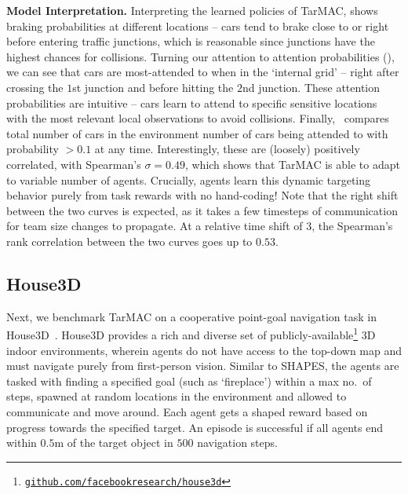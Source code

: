 \vspace{5pt}
\textbf{Model Interpretation.} Interpreting the learned policies of TarMAC,
 shows braking probabilities at different locations --
cars tend to brake close to or right before entering traffic junctions, which is reasonable
since junctions have the highest chances for collisions.
Turning our attention to attention probabilities (),
we can see that cars are most-attended to when in the `internal grid' -- right after
crossing the $1$st junction and before hitting the $2$nd junction. These attention
probabilities are intuitive -- cars learn to attend to specific sensitive locations
with the most relevant local observations to avoid collisions.
Finally,~
compares total number of cars in the environment
\vs number of cars
being attended to with probability $> 0.1$ at any time. Interestingly, these are (loosely)
positively correlated, with Spearman's $\sigma=0.49$, which shows that TarMAC
is able to adapt to variable number of agents. Crucially, agents learn this dynamic targeting behavior purely from task rewards with
no hand-coding! Note that the right shift between the two curves is
expected, as it takes a few timesteps of communication for team size changes to propagate.
At a relative time shift of $3$, the Spearman's rank correlation between the two curves goes up to $0.53$.

\vspace{-5pt}
\subsection{House3D}
\label{sec:h3d}

Next, we benchmark TarMAC on a cooperative point-goal
navigation task in House3D~\citep{house3d}. House3D provides a rich and diverse
set of publicly-available\footnote{\href{https://github.com/facebookresearch/house3d}{\texttt{github.com/facebookresearch/house3d}}}
$3$D indoor environments, wherein agents do not have access to the top-down map
and must navigate purely from first-person vision. Similar to SHAPES, the agents are tasked
with finding a specified goal (such as `fireplace') within a max no.~of steps,
spawned at random locations in the environment and allowed to communicate and move around.
Each agent gets a shaped reward based on progress towards the specified target.
An episode is successful if all agents end within $0.5$m of the target object
in $500$ navigation steps.

